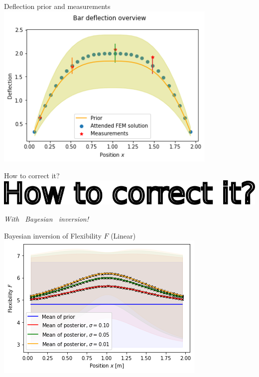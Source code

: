 \documentclass[dvipsnames]{beamer}
\begin{document}
	\begin{frame}{Deflection prior and measurements}
	\centering
	\includegraphics[width=0.8\textwidth]{setup.png}
	\end{frame}
	
	\begin{frame}{How to correct it?}
	\centering
	\includegraphics[width=\textwidth]{correct.png}
	\vspace{1cm}
	\begin{center}
		{\Huge \emph {\textrm{With ~Bayesian ~inversion!}}}
		\end{center}
	\end{frame}
	
	\begin{frame}{Bayesian inversion of Flexibility $F$ (Linear)}
	\centering
	\includegraphics[width=\textwidth]{graphs/linear/flex_mapping.png}
	\end{frame}
	
\end{document}
